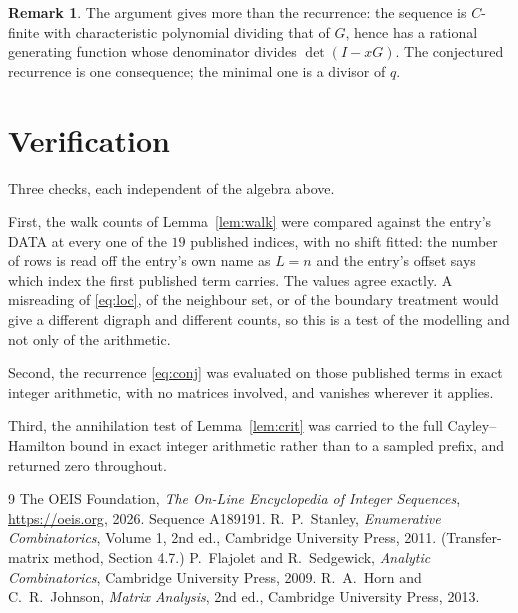 \documentclass[11pt,a4paper]{article}
\theoremstyle{plain}
\theoremstyle{definition}
\newtheorem{remark}[theorem]{Remark}
\begin{document}
\begin{remark}
The argument gives more than the recurrence: the sequence is $C$-finite with characteristic
polynomial dividing that of $G$, hence has a rational generating function whose denominator
divides $\det(I-xG)$. The conjectured recurrence is one consequence; the minimal one is a
divisor of $q$.
\end{remark}

\section{Verification}

Three checks, each independent of the algebra above.

First, the walk counts of Lemma~\ref{lem:walk} were compared against the entry's DATA at
every one of the $19$ published indices, with no shift fitted: the number of rows is
read off the entry's own name as $L=n$ and the entry's offset says which index the first
published term carries. The values agree exactly. A misreading of \eqref{eq:loc}, of the
neighbour set, or of the boundary treatment would give a different digraph and different
counts, so this is a test of the modelling and not only of the arithmetic.

Second, the recurrence \eqref{eq:conj} was evaluated on those published terms in exact
integer arithmetic, with no matrices involved, and vanishes wherever it applies.

Third, the annihilation test of Lemma~\ref{lem:crit} was carried to the full
Cayley--Hamilton bound in exact integer arithmetic rather than to a sampled prefix, and
returned zero throughout.

\begin{thebibliography}{9}
 The OEIS Foundation, \emph{The On-Line Encyclopedia of Integer
Sequences}, \url{https://oeis.org}, 2026. Sequence A189191.
 R.~P.~Stanley, \emph{Enumerative Combinatorics}, Volume 1, 2nd ed.,
Cambridge University Press, 2011. (Transfer-matrix method, Section 4.7.)
 P.~Flajolet and R.~Sedgewick, \emph{Analytic Combinatorics}, Cambridge
University Press, 2009.
 R.~A.~Horn and C.~R.~Johnson, \emph{Matrix Analysis}, 2nd ed., Cambridge
University Press, 2013.
\end{thebibliography}
\end{document}
